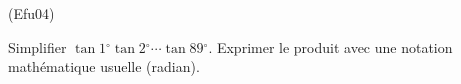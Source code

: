 \begin{tiny}(Efu04)\end{tiny} Simplifier $\tan 1{{}^\circ}\tan 2{{}^\circ}\cdots \tan 89{{}^\circ}$. Exprimer le produit avec une notation mathématique usuelle (radian).